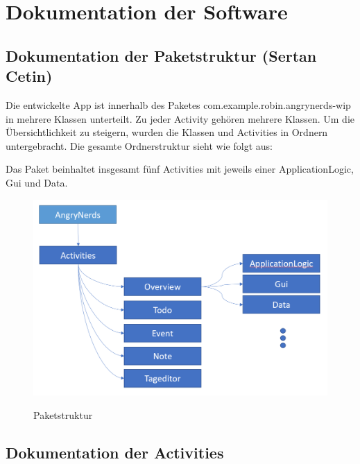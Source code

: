 \section{Dokumentation der Software}
\label{instal}

\subsection{Dokumentation der Paketstruktur (Sertan Cetin)}
Die entwickelte App ist innerhalb des Paketes com.example.robin.angrynerds-wip in mehrere Klassen unterteilt. Zu jeder Activity gehören mehrere Klassen. Um die Übersichtlichkeit zu steigern, wurden die Klassen und Activities in Ordnern untergebracht. Die gesamte Ordnerstruktur sieht wie folgt aus:

Das Paket beinhaltet insgesamt fünf Activities mit jeweils einer ApplicationLogic, Gui und Data.

\begin{figure}[H]
\centering
\begin{minipage}[t]{1\textwidth} %
\caption{Paketstruktur} %
\includegraphics[width=1\textwidth]{img/Paketstruktur}\\ %
\end{minipage}
\end{figure}


\subsection{Dokumentation der Activities}

